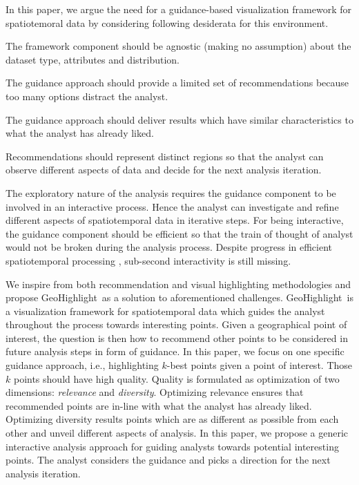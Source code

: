 \documentclass[conference]{IEEEtran}
\newcommand{\sys}{{\sc GeoHighlight}}
\begin{document}
In this paper, we argue the need for a guidance-based visualization framework for spatiotemoral data by considering following desiderata for this environment.

 The framework component should be agnostic (making no assumption) about the dataset type, attributes and distribution.

 The guidance approach should provide a limited set of recommendations because too many options distract the analyst. %

 The guidance approach should deliver results which have similar characteristics to what the analyst has already liked.

 Recommendations should represent distinct regions so that the analyst can observe different aspects of data and decide for the next analysis iteration.

 The exploratory nature of the analysis requires the guidance component to be involved in an interactive process. Hence the analyst can investigate and refine different aspects of spatiotemporal data in iterative steps. For being interactive, the guidance component should be efficient so that the train of thought of analyst would not be broken during the analysis process. Despite progress in efficient spatiotemporal processing \cite{yu2015geospark}, sub-second interactivity is still missing.

We inspire from both recommendation \cite{Omidvar-Tehrani:2015} and visual highlighting \cite{Liang2010,Robinson2011} methodologies and propose \sys\ as a solution to aforementioned challenges. \sys\ is a visualization framework for spatiotemporal data which guides the analyst throughout the process towards interesting points. Given a geographical point of interest, the question is then how to recommend other points to be considered in future analysis steps in form of guidance. In this paper, we focus on one specific guidance approach, i.e., highlighting $k$-best points given a point of interest. Those $k$ points should have high quality. Quality is formulated as optimization of two dimensions: {\em relevance} and {\em diversity}. Optimizing relevance ensures that recommended points are in-line with what the analyst has already liked. Optimizing diversity results points which are as different as possible from each other and unveil different aspects of analysis. In this paper, we propose a generic interactive analysis approach for guiding analysts towards potential interesting points. The analyst considers the guidance and picks a direction for the next analysis iteration.
\end{document}
